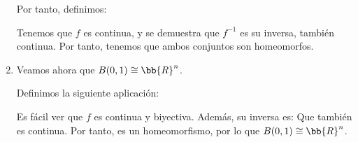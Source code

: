 \begin{ejemplo}
\begin{enumerate}
        Por tanto, definimos:

        Tenemos que $f$ es continua, y se demuestra que $f^{-1}$ es su inversa, también continua. Por tanto, tenemos que ambos conjuntos son homeomorfos.

        \item Veamos ahora que $B(0,1)\cong \bb{R}^n$.

        Definimos la siguiente aplicación:

        Es fácil ver que $f$ es continua y biyectiva. Además, su inversa es: 
        Que también es continua. Por tanto, es un homeomorfismo, por lo que $B(0,1)\cong \bb{R}^n$.
    \end{enumerate}
\end{ejemplo}

